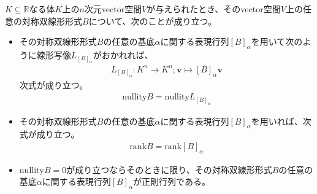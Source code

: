 \documentclass[dvipdfmx]{jsarticle}
\begin{document}
\begin{thm}\label{2.3.5.23}
$K \subseteq \mathbb{R}$なる体$K$上の$n$次元vector空間$V$が与えられたとき、そのvector空間$V$上の任意の対称双線形形式$B$について、次のことが成り立つ。
\begin{itemize}
\item
  その対称双線形形式$B$の任意の基底$\alpha$に関する表現行列$[ B]_{\alpha}$を用いて次のように線形写像$L_{[ B]_{\alpha}}$がおかれれば、
\begin{align*}
L_{[ B]_{\alpha}}:K^{n} \rightarrow K^{n};\mathbf{v} \mapsto [ B]_{\alpha}\mathbf{v}
\end{align*}
次式が成り立つ。
\begin{align*}
{\mathrm{nullity}}B = {\mathrm{nullity}}L_{[ B]_{\alpha}}
\end{align*}
\item
  その対称双線形形式$B$の任意の基底$\alpha$に関する表現行列$[ B]_{\alpha}$を用いれば、次式が成り立つ。
\begin{align*}
{\mathrm{rank}}B = {\mathrm{rank}}[ B]_{\alpha}
\end{align*}
\item
  ${\mathrm{nullity}}B = 0$が成り立つならそのときに限り、その対称双線形形式$B$の任意の基底$\alpha$に関する表現行列$[ B]_{\alpha}$が正則行列である。
\end{itemize}
\end{thm}
\end{document}
